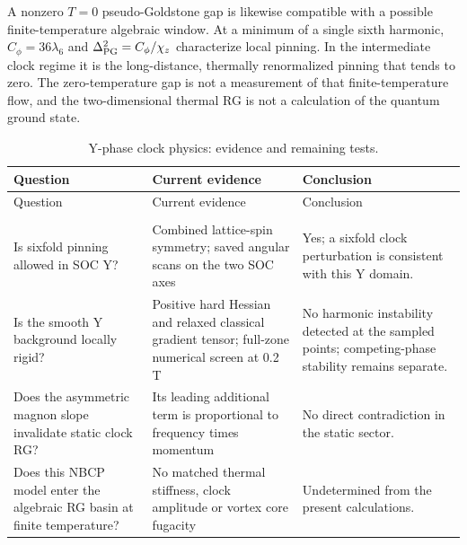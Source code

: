 A nonzero \(T=0\) pseudo-Goldstone gap is likewise compatible with a
possible finite-temperature algebraic window. At a minimum of a single
sixth harmonic, \(C_\phi=36\lambda_6\) and
\(\Delta_{\rm PG}^2=C_\phi/\chi_z\) characterize local pinning. In the
intermediate clock regime it is the long-distance, thermally
renormalized pinning that tends to zero. The zero-temperature gap is not
a measurement of that finite-temperature flow, and the two-dimensional
thermal RG is not a calculation of the quantum ground state.

\begingroup
\setlength{\LTpre}{0pt}
\setlength{\LTpost}{4pt}
\captionsetup{skip=4pt}
\begin{longtable}[]{@{}
  >{\raggedright\arraybackslash}p{}
  >{\raggedright\arraybackslash}p{}
  >{\raggedright\arraybackslash}p{}@{}}
\toprule\noalign{}
\begin{minipage}[b]{\linewidth}\raggedright
Question
\end{minipage} & \begin{minipage}[b]{\linewidth}\raggedright
Current evidence
\end{minipage} & \begin{minipage}[b]{\linewidth}\raggedright
Conclusion
\end{minipage} \\
\midrule\noalign{}
\endfirsthead
\toprule\noalign{}
\begin{minipage}[b]{\linewidth}\raggedright
Question
\end{minipage} & \begin{minipage}[b]{\linewidth}\raggedright
Current evidence
\end{minipage} & \begin{minipage}[b]{\linewidth}\raggedright
Conclusion
\end{minipage} \\
\midrule\noalign{}
\endhead
\bottomrule\noalign{}
\caption{Y-phase clock physics: evidence and remaining tests.}\label{tab-nbcp-07-y-phase-6}\\
\endlastfoot
Is sixfold pinning allowed in SOC Y? & Combined lattice-spin symmetry;
saved angular scans on the two SOC axes & Yes; a sixfold clock
perturbation is consistent with this Y domain. \\
Is the smooth Y background locally rigid? & Positive hard Hessian and
relaxed classical gradient tensor; full-zone numerical screen at 0.2 T &
No harmonic instability detected at the sampled points; competing-phase
stability remains separate. \\
Does the asymmetric magnon slope invalidate static clock RG? & Its
leading additional term is proportional to frequency times momentum & No
direct contradiction in the static sector. \\
Does this NBCP model enter the algebraic RG basin at finite temperature?
& No matched thermal stiffness, clock amplitude or vortex core fugacity
& Undetermined from the present calculations. \\
\end{longtable}
\endgroup

